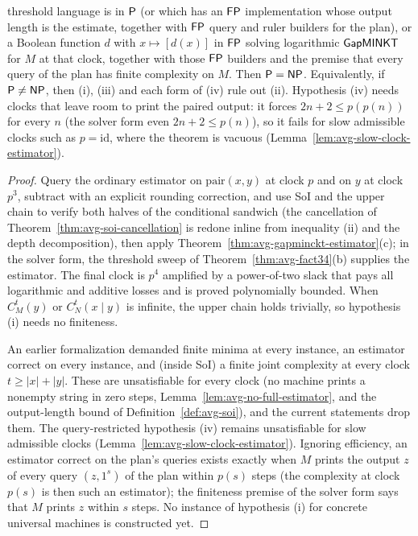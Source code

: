 \begin{theorem}
  threshold language is in $\mathsf{P}$ (or which has an $\mathsf{FP}$ implementation
  whose output length is the estimate, together with $\mathsf{FP}$ query and ruler
  builders for the plan), or a Boolean function $d$ with $x \mapsto [d(x)]$ in
  $\mathsf{FP}$ solving logarithmic $\mathsf{GapMINKT}$ for $M$ at that clock,
  together with those $\mathsf{FP}$ builders and the premise that every query of
  the plan has finite complexity on $M$.
  Then $\mathsf{P} = \mathsf{NP}$. Equivalently, if $\mathsf{P} \neq \mathsf{NP}$, then (i),
  (iii) and each form of (iv) rule out (ii). Hypothesis (iv) needs clocks that
  leave room to print the paired output: it forces $2n + 2 \le p(p(n))$ for
  every $n$ (the solver form even $2n + 2 \le p(n)$), so it fails for slow
  admissible clocks such as $p = \mathrm{id}$, where the theorem is vacuous
  (Lemma~\ref{lem:avg-slow-clock-estimator}).
\end{theorem}
\begin{proof}
  \leanok
  Query the ordinary estimator on $\mathrm{pair}(x,y)$ at clock $p$ and on $y$
  at clock $p^{3}$, subtract with an explicit rounding correction, and use SoI
  and the upper chain to verify both halves of the conditional sandwich (the
  cancellation of Theorem~\ref{thm:avg-soi-cancellation} is redone inline from
  inequality (ii) and the depth decomposition), then apply
  Theorem~\ref{thm:avg-gapminckt-estimator}(c); in the solver form, the
  threshold sweep of Theorem~\ref{thm:avg-fact34}(b) supplies the estimator. The
  final clock is $p^{4}$ amplified by a power-of-two slack that pays all
  logarithmic and additive losses and is proved polynomially bounded. When
  $C^t_M(y)$ or $C^t_N(x \mid y)$ is infinite, the upper chain holds trivially,
  so hypothesis (i) needs no finiteness.

  An earlier formalization demanded finite minima at every instance, an
  estimator correct on every instance, and (inside SoI) a finite joint
  complexity at every clock $t \ge |x| + |y|$. These are unsatisfiable for
  every clock (no machine prints a nonempty string in zero steps,
  Lemma~\ref{lem:avg-no-full-estimator}, and the output-length bound of
  Definition~\ref{def:avg-soi}), and the current statements drop them. The
  query-restricted hypothesis (iv) remains unsatisfiable for slow admissible
  clocks (Lemma~\ref{lem:avg-slow-clock-estimator}). Ignoring efficiency, an
  estimator correct on the plan's queries exists exactly when $M$ prints the
  output $z$ of every query $(z, 1^s)$ of the plan within $p(s)$ steps (the
  complexity at clock $p(s)$ is then such an estimator); the finiteness premise
  of the solver form says that $M$ prints $z$ within $s$ steps.
  No instance of hypothesis (i) for concrete universal machines is constructed
  yet.
\end{proof}


